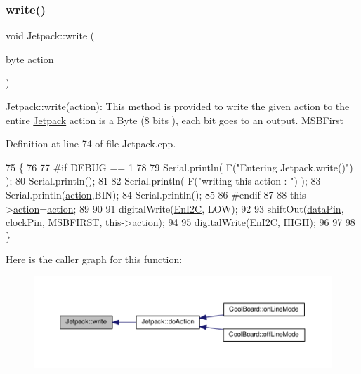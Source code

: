 \subsubsection{\texorpdfstring{write()}{write()}}
{\footnotesize\ttfamily void Jetpack\+::write (\begin{DoxyParamCaption}\item[{byte}]{action }\end{DoxyParamCaption})}

Jetpack\+::write(action)\+: This method is provided to write the given action to the entire \hyperlink{class_jetpack}{Jetpack} action is a Byte (8 bits ), each bit goes to an output. M\+S\+B\+First 

Definition at line 74 of file Jetpack.\+cpp.


\begin{DoxyCode}
75 \{
76 
77 \textcolor{preprocessor}{#if DEBUG == 1}
78 
79     Serial.println( F(\textcolor{stringliteral}{"Entering Jetpack.write()"}) );
80     Serial.println();
81 
82     Serial.println( F(\textcolor{stringliteral}{"writing this action : "}) );
83     Serial.println(\hyperlink{class_jetpack_aca3142925a7b0834b34ae91d26af7765}{action},BIN);
84     Serial.println();
85 
86 \textcolor{preprocessor}{#endif }
87 
88     this->\hyperlink{class_jetpack_aca3142925a7b0834b34ae91d26af7765}{action}=\hyperlink{class_jetpack_aca3142925a7b0834b34ae91d26af7765}{action};
89 
90     
91     digitalWrite(\hyperlink{class_jetpack_a81df984fb4cea98c71aa1a1cfcdfe814}{EnI2C}, LOW);
92     
93     shiftOut(\hyperlink{class_jetpack_a3d669a56e93c71dd25f970d4ed7d0c00}{dataPin}, \hyperlink{class_jetpack_a58ebb991f358f3ae94e82148b0221b5a}{clockPin}, MSBFIRST, this->\hyperlink{class_jetpack_aca3142925a7b0834b34ae91d26af7765}{action});
94 
95     digitalWrite(\hyperlink{class_jetpack_a81df984fb4cea98c71aa1a1cfcdfe814}{EnI2C}, HIGH);
96 
97 
98 \}
\end{DoxyCode}
Here is the caller graph for this function\+:
\nopagebreak
\begin{figure}[H]
\begin{center}
\leavevmode
\includegraphics[width=350pt]{df/d1d/class_jetpack_a338f1af8cbc6504ac69b47c7328569b5_icgraph}
\end{center}
\end{figure}
\mbox{\label{class_jetpack_a79ae7bc3c1828a0551a7c005c4f8bd00}} 
